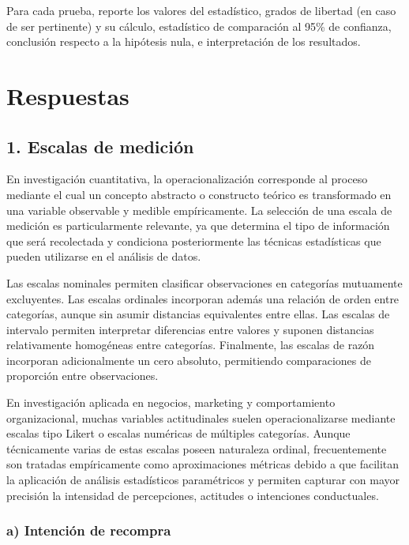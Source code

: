 \documentclass[12pt,letterpaper]{article}
\begin{document}
Para cada prueba, reporte los valores del estadístico, grados de libertad (en caso de ser pertinente) y su cálculo, estadístico de comparación al 95\% de confianza, conclusión respecto a la hipótesis nula, e interpretación de los resultados.

\newpage

\section{Respuestas}

\subsection*{1. Escalas de medición}

En investigación cuantitativa, la operacionalización corresponde al proceso mediante el cual un concepto abstracto o constructo teórico es transformado en una variable observable y medible empíricamente. La selección de una escala de medición es particularmente relevante, ya que determina el tipo de información que será recolectada y condiciona posteriormente las técnicas estadísticas que pueden utilizarse en el análisis de datos.

Las escalas nominales permiten clasificar observaciones en categorías mutuamente excluyentes. Las escalas ordinales incorporan además una relación de orden entre categorías, aunque sin asumir distancias equivalentes entre ellas. Las escalas de intervalo permiten interpretar diferencias entre valores y suponen distancias relativamente homogéneas entre categorías. Finalmente, las escalas de razón incorporan adicionalmente un cero absoluto, permitiendo comparaciones de proporción entre observaciones.

En investigación aplicada en negocios, marketing y comportamiento organizacional, muchas variables actitudinales suelen operacionalizarse mediante escalas tipo Likert o escalas numéricas de múltiples categorías. Aunque técnicamente varias de estas escalas poseen naturaleza ordinal, frecuentemente son tratadas empíricamente como aproximaciones métricas debido a que facilitan la aplicación de análisis estadísticos paramétricos y permiten capturar con mayor precisión la intensidad de percepciones, actitudes o intenciones conductuales.

\subsubsection*{a) Intención de recompra}
\end{document}
